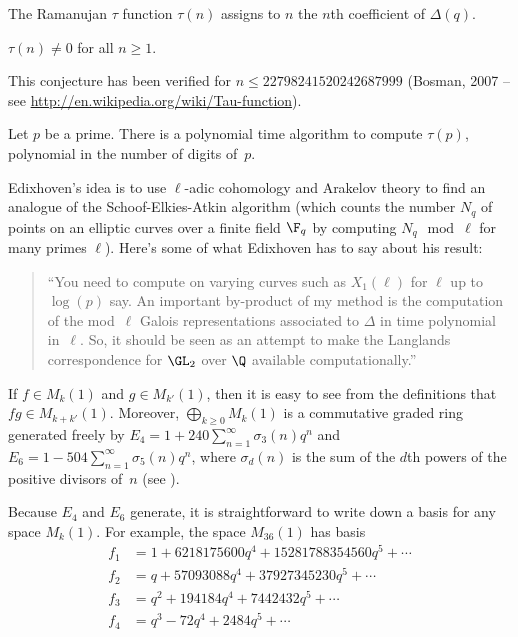 \documentclass{report}
\begin{document}
The Ramanujan $\tau$ function $\tau(n)$ assigns to $n$ the $n$th
coefficient of $\Delta(q)$.
\begin{conjecture}[Lehmer]
$\tau(n)\neq 0$ for all $n\geq 1$.
\end{conjecture}
This conjecture has been verified for $n\leq 22798241520242687999$
(Bosman, 2007 -- see \url{http://en.wikipedia.org/wiki/Tau-function}).

\begin{theorem}[Edixhoven et al.]
Let $p$ be a prime. There is a polynomial time algorithm to compute
$\tau(p)$, polynomial in the number of digits of~$p$.
\end{theorem}
Edixhoven's idea is to use $\ell$-adic cohomology and Arakelov theory
to find an analogue of the Schoof-Elkies-Atkin algorithm (which counts
the number $N_q$ of points on an elliptic curves over a finite field
$\F_q$ by computing $N_q \mod \ell$ for many primes $\ell$).
Here's some of what Edixhoven has to say about his result:
\begin{quote}
  ``You need to compute on varying curves such as $X_1(\ell)$ for
  $\ell$ up to $\log(p)$ say.  An important by-product of my method is
  the computation of the mod~$\ell$ Galois representations associated
  to $\Delta$ in time polynomial in~$\ell$. So, it should be seen as
  an attempt to make the Langlands correspondence for $\GL_2$ over
  $\Q$ available computationally.''
\end{quote}

If $f\in M_k(1)$ and $g\in M_{k'}(1)$,  then it is easy
to see from the definitions that $fg\in M_{k+k'}(1)$.
Moreover,
 $\bigoplus_{k\geq 0} M_k(1)$ is a commutative
graded ring generated freely
by $E_4=1+240\sum_{n=1}^{\infty} \sigma_3(n)q^n$
and $E_6=1-504\sum_{n=1}^{\infty} \sigma_5(n) q^n$,
where $\sigma_d(n)$ is the sum of the $d$th powers
of the positive divisors of~$n$ (see
\cite[Ch.7, \S3.2]{serre:arithmetic}).

\begin{example}\label{ex:k36}
Because $E_4$ and $E_6$ generate, it is straightforward to write down
a basis for any space $M_k(1)$.  For example, the space
$M_{36}(1)$ has basis
\begin{align*}
   f_1 &= 1 + 6218175600q^4 + 15281788354560q^5 + \cdots\\
   f_2 &= q + 57093088q^4 + 37927345230q^5 + \cdots \\
   f_3 &= q^2 + 194184q^4 + 7442432q^5 +\cdots\\
   f_4 &= q^3 - 72q^4 + 2484q^5 +\cdots
\end{align*}
\end{example}
\end{document}

